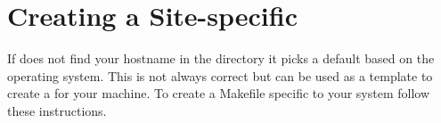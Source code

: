 \begin{comment}
\subsection{Rewriting F90 code}
The \code{setup_reorder.py} script takes as input a Fortran90 file, say
\code{file.F90}. Information about which variables need to be re-ordered
must be present in the file itself. More specifically, the script scans
the source code for lines of the form
\begin{codeseg}
!!REORDER(<n>): <varlist>
\end{codeseg}
\noindent where \verb!<n>! is either 4 or 5 and \verb!<varlist>! is a list of
variable names.  This means that the specified variables are of the given
dimension (4 or 5) and that all array accesses of the form \code{avar(v,x,y,z,b)}
and \code{bvar(v,x,y,z)} are translated to \code{avar(x,y,z,v,b)} and
\code{bvar(x,y,z,v)} respectively.  These \verb?!!REORDER? lines may appear any
number of times in the source code. It is recommended, however, that one put the
\verb?!!REORDER? line immediately after the variable declaration.

\textbf{Caveat}: Since array declarations also need to be changed, the arrays should
be declared in a way that makes it possible for \code{setup_reorder.py} to re-order
them as well, \eg, use:
\begin{codeseg}
real :: solnData(NVARS,10,10,10)
\end{codeseg}
instead of
\begin{codeseg}
real, dimension(NVARS,10,10,10) :: solnData
\end{codeseg}

The input file \code{file.F90} is renamed to \code{file.F90.orig} and the rewritten
code is written to \code{file.F90}. The \code{reorder.sh} calls \code{setup_reorder.py} to
rewrite \code{file.F90} only if \code{file.F90.orig} has changed.
Thus the user only needs to edit \code{file.F90.orig} which is usually a link to a
working copy of the appropriate implementation of \code{file.F90}.
\end{comment}
\section{Creating a Site-specific }
\label{Sec:SetupMakefile}

If \setup does not find your hostname in the  directory
it picks a default  based on the operating system.
This  is not always correct but can be used as a
template to create a  for your machine. To create a
Makefile specific to your system follow these instructions.

